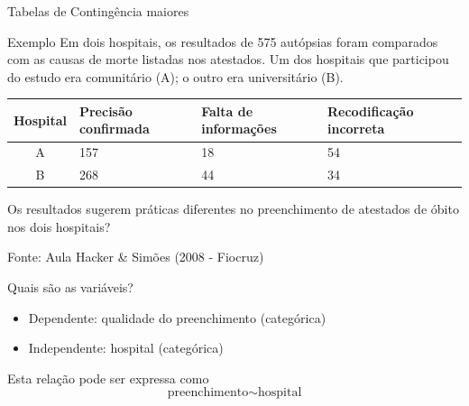 \documentclass{beamer}
\begin{document}



\begin{frame}{Tabelas de Contingência maiores}
  \begin{exampleblock}{Exemplo}
    \footnotesize
    Em dois hospitais, os resultados de 575 autópsias
    foram comparados com as causas de morte listadas nos
    atestados. Um dos hospitais que participou do estudo era
    comunitário (A); o outro era universitário (B).

    \bigskip
    \scriptsize
    \begin{tabular}{c|p{2cm}|p{2cm}|p{2cm}}
      Hospital & Precisão confirmada & Falta de informações &
      Recodificação incorreta \\
      \hline
      A & 157 & 18 & 54 \\
      \hline
      B & 268 & 44 & 34 \\
    \end{tabular}
    \small
    \bigskip
    \bigskip
    Os resultados sugerem práticas diferentes no preenchimento de
    atestados de óbito nos dois hospitais?
  \end{exampleblock}
  \vfill
  {\hfill \footnotesize Fonte: Aula Hacker \& Simões (2008 - Fiocruz)}
\end{frame}

\begin{frame}{Quais são as variáveis?}
  \begin{itemize}
    \small
  \item Dependente: qualidade do preenchimento (categórica)
  \item Independente: hospital (categórica)
  \end{itemize}
  \vfill
  \begin{block}{Esta relação pode ser expressa como}
    \begin{displaymath}
      \text{preenchimento} \sim \text{hospital}
    \end{displaymath}
  \end{block}
\end{frame}
\end{document}
